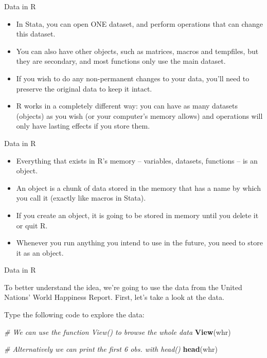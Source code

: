 \documentclass[ignorenonframetext,]{beamer}
\newenvironment{Shaded}{\begin{snugshade}}{\end{snugshade}}
\newcommand{\KeywordTok}[1]{\textcolor[rgb]{0.13,0.29,0.53}{\textbf{#1}}}
\newcommand{\CommentTok}[1]{\textcolor[rgb]{0.56,0.35,0.01}{\textit{#1}}}
\newcommand{\NormalTok}[1]{#1}
\begin{document}
\begin{frame}{Data in R}

\begin{itemize}
\item
  In Stata, you can open ONE dataset, and perform operations that can
  change this dataset.
\item
  You can also have other objects, such as matrices, macros and
  tempfiles, but they are secondary, and most functions only use the
  main dataset.
\item
  If you wish to do any non-permanent changes to your data, you'll need
  to preserve the original data to keep it intact.
\item
  R works in a completely different way: you can have as many datasets
  (objects) as you wish (or your computer's memory allows) and
  operations will only have lasting effects if you store them.
\end{itemize}

\end{frame}

\begin{frame}{Data in R}

\begin{itemize}
\item
  Everything that exists in R's memory -- variables, datasets, functions
  -- is an object.
\item
  An object is a chunk of data stored in the memory that has a name by
  which you call it (exactly like macros in Stata).
\item
  If you create an object, it is going to be stored in memory until you
  delete it or quit R.
\item
  Whenever you run anything you intend to use in the future, you need to
  store it as an object.
\end{itemize}

\end{frame}

\begin{frame}[fragile]{Data in R}

To better understand the idea, we're going to use the data from the
United Nations' World Happiness Report. First, let's take a look at the
data.

Type the following code to explore the data:

\begin{Shaded}
\begin{Highlighting}[]
\CommentTok{# We can use the function View() to browse the whole data}
\KeywordTok{View}\NormalTok{(whr)}

\CommentTok{# Alternatively we can print the first 6 obs. with head()}
\KeywordTok{head}\NormalTok{(whr)}
\end{Highlighting}
\end{Shaded}

\end{frame}
\end{document}
